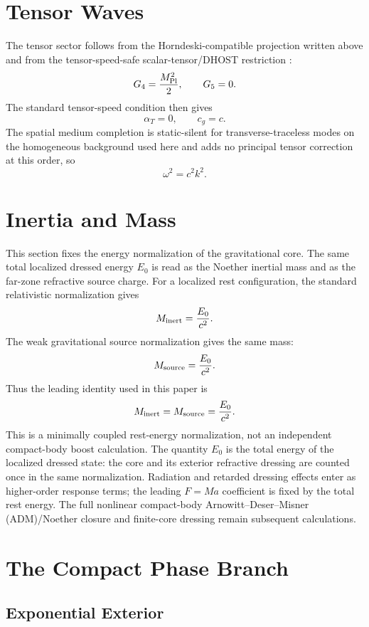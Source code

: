 \documentclass[12pt,a4paper]{article}
\begin{document}
\section{Tensor Waves}

The tensor sector follows from the Horndeski-compatible projection written above
and from the tensor-speed-safe scalar-tensor/DHOST restriction
\cite{Gleyzes2015,Langlois2016,Achour2016,Crisostomi2016}:
\[
G_4=\frac{M_{\rm Pl}^2}{2},\qquad G_5=0.
\]
The standard tensor-speed condition then gives
\[
\alpha_T=0,
\qquad
c_g=c.
\]
The spatial medium completion is static-silent for transverse-traceless modes
on the homogeneous background used here and adds no principal tensor correction
at this order, so
\[
\omega^2=c^2k^2.
\]

\section{Inertia and Mass}

This section fixes the energy normalization of the gravitational core. The same total localized dressed energy $E_0$ is read as the Noether inertial mass and as the far-zone refractive source charge. For a localized rest configuration, the standard relativistic normalization gives
\[
M_{\rm inert}=\frac{E_0}{c^2}.
\]
The weak gravitational source normalization gives the same mass:
\[
M_{\rm source}=\frac{E_0}{c^2}.
\]
Thus the leading identity used in this paper is
\[
M_{\rm inert}=M_{\rm source}=\frac{E_0}{c^2}.
\]
This is a minimally coupled rest-energy normalization, not an independent compact-body boost calculation.
The quantity $E_0$ is the total energy of the localized dressed state: the core and its exterior refractive dressing are counted once in the same normalization. Radiation and retarded dressing effects enter as higher-order response terms; the leading $F=Ma$ coefficient is fixed by the total rest energy. The full nonlinear compact-body Arnowitt--Deser--Misner (ADM)/Noether closure and finite-core dressing remain subsequent calculations.

\section{The Compact Phase Branch}

\subsection{Exponential Exterior}
\end{document}

